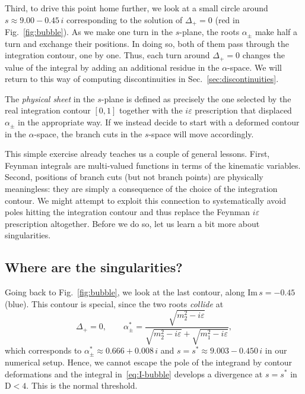 \documentclass[12pt]{article}
\numberwithin{figure}{section}
\def \be {\begin{equation}}
\def \ee {\end{equation}}
\def \D {\mathrm{D}}
\def \eps {\varepsilon}
\def \Im {\mathrm{Im}}
\begin{document}
	Third, to drive this point home further, we look at a small circle around $s \approx 9.00 - 0.45\,i$ corresponding to the solution of $\Delta_+ = 0$ (red in Fig.~\ref{fig:bubble}). As we make one turn in the $s$-plane, the roots $\alpha_\pm$ make half a turn and exchange their positions. In doing so, both of them pass through the integration contour, one by one. Thus, each turn around $\Delta_+ = 0$ changes the value of the integral by adding an additional residue in the $\alpha$-space. We will return to this way of computing discontinuities in Sec.~\ref{sec:discontinuities}.
	
	The \emph{physical sheet} in the $s$-plane is defined as precisely the one selected by the real integration contour $[0,1]$ together with the $i\eps$ prescription that displaced $\alpha_\pm$ in the appropriate way. If we instead decide to start with a deformed contour in the $\alpha$-space, the branch cuts in the $s$-space will move accordingly.
	
	This simple exercise already teaches us a couple of general lessons. First, Feynman integrals are multi-valued functions in terms of the kinematic variables.
	Second, positions of branch cuts (but not branch points) are physically meaningless: they are simply a consequence of the choice of the integration contour.
	We might attempt to exploit this connection to systematically avoid poles hitting the integration contour and thus replace the Feynman $i\eps$ prescription altogether. Before we do so, let us learn a bit more about singularities.
	
	\subsection{\label{sec:singularities}Where are the singularities?}
	
	Going back to Fig.~\ref{fig:bubble}, we look at the last contour, along $\Im\, s = -0.45$ (blue). This contour is special, since the two roots \emph{collide} at
	\be\label{eq:alpha-normal}
	\Delta_+ = 0, \qquad \alpha_\pm^\ast = \frac{\sqrt{m_2^2 - i\eps}}{\sqrt{m_2^2 - i\eps} + \sqrt{m_1^2 - i\eps}},
	\ee
	which corresponds to $\alpha_\pm^\ast \approx 0.666 + 0.008 \, i$ and $s=s^\ast\approx 9.003 - 0.450\, i$ in our numerical setup. Hence, we cannot escape the pole of the integrand by contour deformations and the integral in~\eqref{eq:I-bubble} develops a divergence at $s=s^\ast$ in $\D<4$. This is the normal threshold.
	
\end{document}
